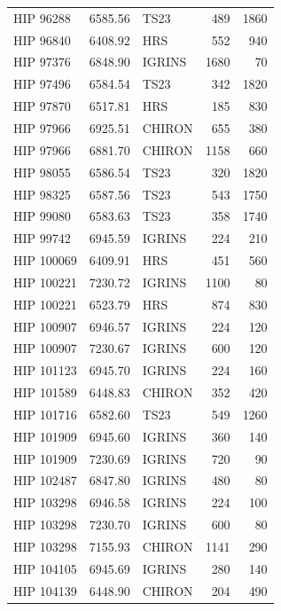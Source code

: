 \begin{scriptsize}
\begin{longtable}{|l|rlrr|}
   HIP 96288 &  6585.56 &       TS23 &      489 &  1860 \\
   HIP 96840 &  6408.92 &        HRS &      552 &   940 \\
   HIP 97376 &  6848.90 &     IGRINS &     1680 &    70 \\
   HIP 97496 &  6584.54 &       TS23 &      342 &  1820 \\
   HIP 97870 &  6517.81 &        HRS &      185 &   830 \\
   HIP 97966 &  6925.51 &     CHIRON &      655 &   380 \\
   HIP 97966 &  6881.70 &     CHIRON &     1158 &   660 \\
   HIP 98055 &  6586.54 &       TS23 &      320 &  1820 \\
   HIP 98325 &  6587.56 &       TS23 &      543 &  1750 \\
   HIP 99080 &  6583.63 &       TS23 &      358 &  1740 \\
   HIP 99742 &  6945.59 &     IGRINS &      224 &   210 \\
  HIP 100069 &  6409.91 &        HRS &      451 &   560 \\
  HIP 100221 &  7230.72 &     IGRINS &     1100 &    80 \\
  HIP 100221 &  6523.79 &        HRS &      874 &   830 \\
  HIP 100907 &  6946.57 &     IGRINS &      224 &   120 \\
  HIP 100907 &  7230.67 &     IGRINS &      600 &   120 \\
  HIP 101123 &  6945.70 &     IGRINS &      224 &   160 \\
  HIP 101589 &  6448.83 &     CHIRON &      352 &   420 \\
  HIP 101716 &  6582.60 &       TS23 &      549 &  1260 \\
  HIP 101909 &  6945.60 &     IGRINS &      360 &   140 \\
  HIP 101909 &  7230.69 &     IGRINS &      720 &    90 \\
  HIP 102487 &  6847.80 &     IGRINS &      480 &    80 \\
  HIP 103298 &  6946.58 &     IGRINS &      224 &   100 \\
  HIP 103298 &  7230.70 &     IGRINS &      600 &    80 \\
  HIP 103298 &  7155.93 &     CHIRON &     1141 &   290 \\
  HIP 104105 &  6945.69 &     IGRINS &      280 &   140 \\
  HIP 104139 &  6448.90 &     CHIRON &      204 &   490 \\

\end{longtable}
\end{scriptsize}
